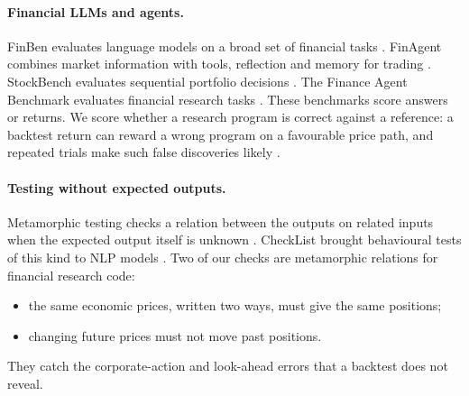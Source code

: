 \paragraph{Financial LLMs and agents.}
FinBen evaluates language models on a broad set of financial tasks \citep{xie2024finben}.
FinAgent combines market information with tools, reflection and memory for trading
\citep{zhang2024finagent}. StockBench evaluates sequential portfolio decisions
\citep{chen2025stockbench}. The Finance Agent Benchmark evaluates financial research tasks
\citep{bigeard2025finance}. These benchmarks score answers or returns. We score whether a
research program is correct against a reference: a backtest return can reward a wrong
program on a favourable price path, and repeated trials make such false discoveries likely
\citep{lopezdeprado2018advances,bailey2017pbo}.

\paragraph{Testing without expected outputs.}
Metamorphic testing checks a relation between the outputs on related inputs when the
expected output itself is unknown \citep{segura2016metamorphic}. CheckList brought
behavioural tests of this kind to NLP models \citep{ribeiro2020checklist}. Two of our checks
are metamorphic relations for financial research code:
\begin{itemize}
\item the same economic prices, written two ways, must give the same positions;
\item changing future prices must not move past positions.
\end{itemize}
They catch the corporate-action and look-ahead errors that a backtest does not reveal.
